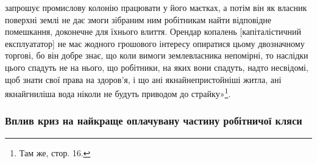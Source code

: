 \parcont{}  %
запрошує промислову колонію працювати у його маєтках, а
потім він як власник поверхні землі не дає змоги зібраним ним
робітникам найти відповідне помешкання, доконечне для їхнього
влиття. Орендар копалень [капіталістичний експлуататор] не
має жодного грошового інтересу опиратися цьому двозначному
торгові, бо він добре знає, що коли вимоги землевласника непомірні,
то наслідки цього спадуть не на нього, що робітники, на
яких вони спадуть, надто несвідомі, щоб знати свої права на здоров’я,
і що ані якнайнепристойніші житла, ані якнайгниліша
вода ніколи не будуть приводом до страйку»\footnote{
Там же, стор. 16.
}.

\subsubsection{Вплив криз на найкраще оплачувану
частину робітничої кляси}

